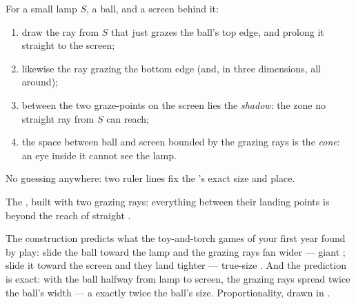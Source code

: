 \begin{method}\label{met:g6:light-propagation:shadow}
For a small lamp $S$, a ball, and a screen behind it:
\begin{enumerate}
  \item draw the ray from $S$ that just grazes the ball's top
        edge, and prolong it straight to the screen;
  \item likewise the ray grazing the bottom edge (and, in three
        dimensions, all around);
  \item between the two graze-points on the screen lies the
        \emph{shadow}: the zone no straight ray from
        $S$ can reach;
  \item the space between ball and screen bounded by the grazing
        rays is the \emph{ cone}: an eye inside it cannot
        see the lamp.
\end{enumerate}
No guessing anywhere: two ruler lines fix the 's exact size
and place.
\end{method}

\begin{omfigure}

{\small The , built with two grazing rays: everything between
their landing points is beyond the reach of straight .}
\end{omfigure}

\begin{example}\label{ex:g6:light-propagation:sizes}
The construction predicts what the toy-and-torch games of your
first year found by play: slide the ball toward the lamp and the
grazing rays fan wider --- giant ; slide it toward the
screen and they land tighter --- true-size . And the
prediction is exact: with the ball halfway from lamp to screen,
the grazing rays spread twice the ball's width --- a 
exactly twice the ball's size. Proportionality, drawn in .
\end{example}

